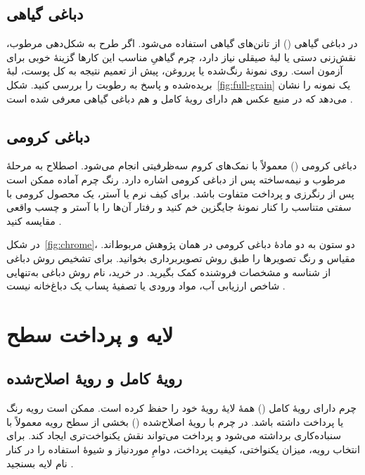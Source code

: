 \subsection{دباغی گیاهی}

در دباغی گیاهی () از تانن‌های گیاهی استفاده می‌شود. اگر طرح به شکل‌دهی مرطوب، نقش‌زنی دستی یا لبۀ صیقلی نیاز دارد، چرم گیاهیِ مناسب این کارها گزینۀ خوبی برای آزمون است. روی نمونۀ رنگ‌شده یا پرروغن، پیش از تعمیم نتیجه به کل پوست، لبۀ بریده‌شده و پاسخ به رطوبت را بررسی کنید. شکل~\ref{fig:full-grain} یک نمونه را نشان می‌دهد که در منبع عکس هم دارای رویۀ کامل و هم دباغی گیاهی معرفی شده است \cite{jrc}.


\subsection{دباغی کرومی}

دباغی کرومی () معمولاً با نمک‌های کروم سه‌ظرفیتی انجام می‌شود. اصطلاح  به مرحلۀ مرطوب و نیمه‌ساخته پس از دباغی کرومی اشاره دارد. رنگ چرم آماده ممکن است پس از رنگرزی و پرداخت متفاوت باشد. برای کیف نرم یا آستر، یک محصول کرومی با سفتی متناسب را کنار نمونۀ جایگزین خم کنید و رفتار آن‌ها را با آستر و چسب واقعی مقایسه کنید \cite{jrc,lwg}.


در شکل~\ref{fig:chrome}، دو ستون به دو مادۀ دباغی کرومی در همان پژوهش مربوط‌اند. مقیاس و رنگ تصویرها را طبق روش تصویربرداری بخوانید. برای تشخیص روش دباغی از شناسه و مشخصات فروشنده کمک بگیرید. در خرید، نام روش دباغی به‌تنهایی شاخص ارزیابی آب، مواد ورودی یا تصفیۀ پساب یک دباغ‌خانه نیست \cite{jrc,chrome}.

\newpage
\section{لایه و پرداخت سطح}

\subsection{رویۀ کامل و رویۀ اصلاح‌شده}

چرم دارای رویۀ کامل () همۀ لایۀ رویۀ خود را حفظ کرده است. ممکن است رویه رنگ یا پرداخت داشته باشد. در چرم با رویۀ اصلاح‌شده () بخشی از سطح رویه معمولاً با سنباده‌کاری برداشته می‌شود و پرداخت می‌تواند نقش یکنواخت‌تری ایجاد کند. برای انتخاب رویه، میزان یکنواختی، کیفیت پرداخت، دوامِ موردنیاز و شیوۀ استفاده را در کنار نام لایه بسنجید \cite{lwg,jrc}.

